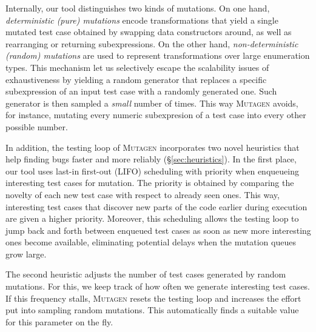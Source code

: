 \documentclass[sigconf,review,anonymous]{acmart}
\newcommand{\mutagen}{\textsc{Mutagen}\xspace}
\begin{document}
%
Internally, our tool distinguishes two kinds of mutations.
%
On one hand, \emph{deterministic (pure) mutations} encode transformations that
yield a single mutated test case obtained by swapping data constructors around,
as well as rearranging or returning subexpressions.
%
On the other hand, \emph{non-deterministic (random) mutations} are used to
represent transformations over large enumeration types.
%
%
This mechanism let us selectively escape the scalability issues of
exhaustiveness by yielding a random generator that replaces a specific
subexpression of an input test case with a randomly generated one.
%
Such generator is then sampled a \emph{small} number of times. 
%
This way \mutagen avoids, for instance, mutating every numeric subexpresion of a
test case into every other possible number.


In addition, the testing loop of \mutagen incorporates two novel heuristics that
help finding bugs faster and more reliably (\S \ref{sec:heuristics}).
%
In the first place, our tool uses last-in first-out (LIFO) scheduling with
priority when enqueueing interesting test cases for mutation.
%
The priority is obtained by comparing the novelty of each new test case with
respect to already seen ones.
%
This way, interesting test cases that discover new parts of the code earlier
during execution are given a higher priority.
%
Moreover, this scheduling allows the testing loop to jump back and forth between
enqueued test cases as soon as new more interesting ones become available,
eliminating potential delays when the mutation queues grow large.


The second heuristic adjusts the number of test cases generated by random
mutations. 
%
%
For this, we keep track of how often we generate interesting test cases.
%
If this frequency stalls, \mutagen resets the testing loop and increases the
effort put into sampling random mutations.
%
This automatically finds a suitable value for this parameter on the fly.
\end{document}
